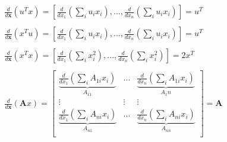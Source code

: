 \begin{equation}
\begin{array}{l}
\frac{d}{d\mathbf{x}} \left(u^Tx\right) = \left[\frac{d}{dx_1}\left(\sum_i u_i x_i\right),...,\frac{d}{dx_n}\left(\sum_i u_i x_i\right)\right] = u^T\\
\\
\frac{d}{d\mathbf{x}} \left(x^Tu\right) = \left[\frac{d}{dx_1}\left(\sum_i u_i x_i\right),...,\frac{d}{dx_n}\left(\sum_i u_i x_i\right)\right] = u^T\\
\\
\frac{d}{d\mathbf{x}} \left(x^Tx\right) = \left[\frac{d}{dx_1}\left(\sum_i x_i^2\right),...,\frac{d}{dx_n}\left(\sum_i x_i^2\right)\right] = 2x^T\\
\\
\frac{d}{d\mathbf{x}} \left(\mathbf{A}x\right) = \left[
\begin{array}{ccc} 
\underbrace{\frac{d}{dx_1}\left(\sum_i A_{1i} x_i\right)}_{A_{11}} &...& \underbrace{\frac{d}{dx_n}\left(\sum_i A_{1i} x_i\right)}_{A_1n}\\
\vdots&\vdots&\vdots\\
\underbrace{\frac{d}{dx_1}\left(\sum_i A_{ni} x_i\right)}_{A_{n1}} &...& \underbrace{\frac{d}{dx_n}\left(\sum_i A_{ni} x_i\right)}_{A_{nn}}\\
\end{array}\right] = \mathbf{A}\\
\end{array}
\end{equation}


\chapauthor{}
